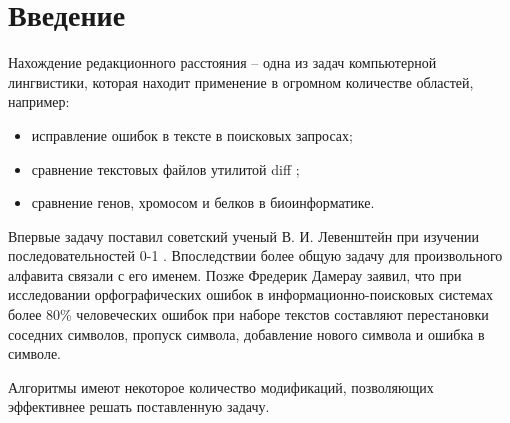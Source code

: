 \chapter*{Введение}

Нахождение редакционного расстояния -- одна из задач компьютерной лингвистики, которая находит применение в огромном количестве областей, например:
\begin{itemize}
	\item исправление ошибок в тексте в поисковых запросах;
    \item сравнение текстовых файлов утилитой diff \cite{diff};
    \item сравнение генов, хромосом и белков в биоинформатике.
\end{itemize}

Впервые задачу поставил советский ученый В. И. Левенштейн при изучении последовательностей 0-1 \cite{levenshtein}.
Впоследствии более общую задачу для произвольного алфавита связали с его именем.
Позже Фредерик Дамерау заявил, что при исследовании орфографических ошибок в информационно-поисковых системах более 80\% человеческих ошибок при наборе текстов составляют перестановки соседних символов, пропуск символа, добавление нового символа и ошибка в символе.

Алгоритмы имеют некоторое количество модификаций, позволяющих эффективнее решать поставленную задачу.

